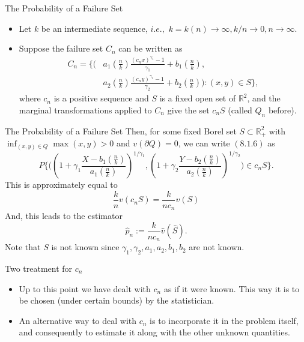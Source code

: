 \documentclass[11pt]{beamer}
\begin{document}
\begin{frame}{The Probability of a Failure Set}
\begin{itemize}
\item Let $k$ be an intermediate sequence, $i.e., $ $k=k(n)\to \infty, k/n \to 0,n\to \infty$.
\item Suppose the failure set $C_n$ can be written as
\begin{equation}\tag{8.1.9}
\begin{split}
C_n=\{\big( & a_1(\frac{n}{k})\frac{(c_nx)^{\gamma_1}-1}{\gamma_1}+b_1(\frac{n}{k}),\\
  & a_2(\frac{n}{k})\frac{(c_ny)^{\gamma_2}-1}{\gamma_2}+b_2(\frac{n}{k})\big ): (x,y) \in S \},
\end{split}
\end{equation}
where $c_n$ is a positive sequence and $S$ is a fixed open set of $\mathbb{R}^2$, and the marginal transformations applied to $C_n$ give the set $c_n S$ (called $Q_n$ before).
\end{itemize}
\end{frame}






\begin{frame}{The Probability of a Failure Set}
Then, for some fixed Borel set $S\subset \mathbb{R}_{+}^2$ with $\inf_{(x,y)\in Q} \max(x,y)>0$ and $v(\partial Q)=0$, we can write $(8.1.6)$ as 
\begin{displaymath}
P\{ \big(    (1+\gamma_1 \dfrac{X-b_1(\frac{n}{k})}{a_1(\frac{n}{k})})^{1/\gamma_1}, (1+\gamma_2 \dfrac{Y-b_2(\frac{n}{k})}{a_2(\frac{n}{k})})^{1/\gamma_2}            \big)\in c_n S\}.
\end{displaymath}
This is approximately equal to
\begin{displaymath}
\frac{k}{n}v(c_nS)=\frac{k}{nc_n}v(S)
\end{displaymath}
And, this leads to the estimator
\begin{displaymath}
\hat{p}_n:=\frac{k}{nc_n}\hat{v}(\hat{S}).
\end{displaymath}
Note that $S$ is not known since $\gamma_1,\gamma_2,a_1,a_2,b_1,b_2$ are not known.              
\end{frame}


\begin{frame}{Two treatment for $c_n$}
\begin{itemize}
\item Up to this point we have dealt with  $c_n$ as if it were known. This way it is to be chosen (under certain bounds) by the statistician.
\vspace{4ex}
\item An alternative way to deal with $c_n$ is to incorporate it in the problem itself, and consequently to estimate it along with the other unknown quantities.
\end{itemize}
\end{frame}
\end{document}
